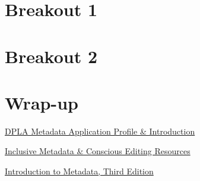 \documentclass[11pt]{article}
\begin{document}
\section*{Breakout 1}
\label{sec:org8e24f35}
\section*{Breakout 2}
\label{sec:org7b711f1}
\section*{Wrap-up}
\label{sec:org9d849cf}

\href{http://dp.la/info/map}{DPLA Metadata Application Profile \& Introduction}

\href{https://docs.google.com/document/d/1APavAd1p1f9y1vBUudQIuIsYnq56ypzNYJYgDA9RNbU/edit\#heading=h.nq945w62b6fe}{Inclusive Metadata \& Conscious Editing Resources}

\href{https://www.getty.edu/publications/intrometadata/}{Introduction to Metadata, Third Edition}
\end{document}
